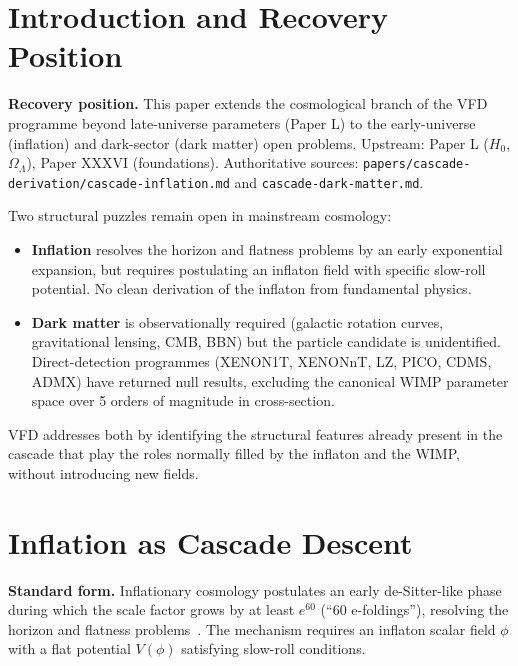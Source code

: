\documentclass[12pt]{article}
\theoremstyle{remark}
\begin{document}
\section{Introduction and Recovery Position}\label{sec:intro}

\textbf{Recovery position.} This paper extends the cosmological branch of the VFD programme beyond late-universe parameters (Paper L) to the early-universe (inflation) and dark-sector (dark matter) open problems. Upstream: Paper L ($H_0$, $\Omega_\Lambda$), Paper XXXVI (foundations). Authoritative sources: \texttt{papers/cascade-derivation/cascade-inflation.md} and \texttt{cascade-dark-matter.md}.

Two structural puzzles remain open in mainstream cosmology:
\begin{itemize}
\item \textbf{Inflation} resolves the horizon and flatness problems by an early exponential expansion, but requires postulating an inflaton field with specific slow-roll potential. No clean derivation of the inflaton from fundamental physics.
\item \textbf{Dark matter} is observationally required (galactic rotation curves, gravitational lensing, CMB, BBN) but the particle candidate is unidentified. Direct-detection programmes (XENON1T, XENONnT, LZ, PICO, CDMS, ADMX) have returned null results, excluding the canonical WIMP parameter space over 5 orders of magnitude in cross-section.
\end{itemize}

VFD addresses both by identifying the structural features already present in the cascade that play the roles normally filled by the inflaton and the WIMP, without introducing new fields.

\section{Inflation as Cascade Descent}\label{sec:inflation}

\textbf{Standard form.} Inflationary cosmology postulates an early de-Sitter-like phase during which the scale factor grows by at least $e^{60}$ (``60 e-foldings''), resolving the horizon and flatness problems~\citep{Guth1981, Linde1982}. The mechanism requires an inflaton scalar field $\phi$ with a flat potential $V(\phi)$ satisfying slow-roll conditions.
\end{document}

